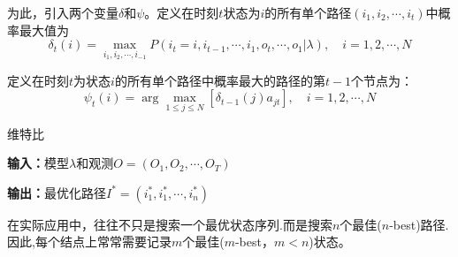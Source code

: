 \documentclass[a4paper,UTF8,no-math]{ctexart}
\begin{document}
	为此，引入两个变量$\delta$和$\psi$。定义在时刻$t$状态为$i$的所有单个路径$\left(i_{1}, i_{2}, \cdots, i_{t}\right)$中概率最大值为$$\delta_{t}(i)=\max _{i_{1}, i_{2}, \cdots, i_{-1}} P\left(i_{t}=i, i_{t-1}, \cdots, i_{1}, o_{t}, \cdots, o_{1} | \lambda\right), \quad i=1,2, \cdots, N$$
	
	定义在时刻$t$为状态$i$的所有单个路径中概率最大的路径的第$t-1$个节点为：$$\psi_{t}(i)=\arg \max _{1 \leq j \leqslant N}\left[\delta_{t-1}(j) a_{j t}\right], \quad i=1,2, \cdots, N$$
	
	
	\begin{algorithm}[htb]
		\caption{维特比}
		\label{alg:viterbi}
		{\bf 输入：}模型$\lambda$和观测$O = (O_{1},O_{2}, \cdots ,O_{T})$
		
		{\bf 输出：}最优化路径$I^{*} = (i^{*}_{1},i^{*}_{1},\cdots,i^{*}_{n})$
		
		\begin{algorithmic}[1] 
		\end{algorithmic} 
	
	\end{algorithm}
	
	在实际应用中，往往不只是搜索一个最优状态序列.而是搜索$n$个最佳($n$-best)路径.因此,每个结点上常常需要记录$m$个最佳($m$-best，$m<n$)状态。
	
	
	
%	
%	
%	
	
\end{document}
